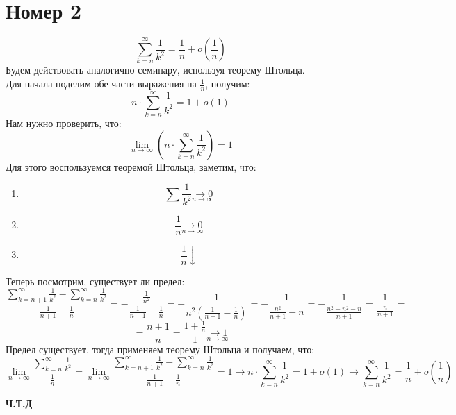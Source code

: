\documentclass[a4paper,12pt]{article}
\begin{document}
\section*{Номер 2}
\[
\sum_{k = n}^{\infty} \frac{1}{k^2} = \frac{1}{n}  + o \left(\frac1n\right)
\]
Будем действовать аналогично семинару, используя теорему Штольца.
\\
Для начала поделим обе части выражения на $\frac1n$, получим:
\[
n \cdot \sum_{k = n}^{\infty} \frac{1}{k^2} = 1 + o\left(1\right)
\]
Нам нужно проверить, что:
\[
\lim_{n \rightarrow \infty} \left(n \cdot \sum_{k = n}^{\infty} \frac{1}{k^2} \right) = 1
\]
Для этого воспользуемся теоремой Штольца, заметим, что:
\begin{enumerate}
\item
\[
\sum \frac{1}{k^2} \underset{n \rightarrow \infty}{\longrightarrow 0}
\]
\item
\[
\frac{1}{n} \underset{n \rightarrow \infty}{\longrightarrow 0}
\]
\item
\[
\frac{1}{n} \downarrow
\]
\end{enumerate}
Теперь посмотрим, существует ли предел:
\[
\frac{\sum\limits_{k = n + 1}^{\infty} \frac{1}{k^2} - \sum\limits_{k = n}^{\infty} \frac{1}{k^2}}{\frac{1}{n + 1} - \frac{1}{n}} = -\frac{\frac{1}{n^2}}{\frac{1}{n + 1} - \frac{1}{n}} = - \frac{1}{n^2\left(\frac{1}{n+1} - \frac{1}{n}\right)} = - \frac{1}{\frac{n^2}{n + 1} - n} = - \frac{1}{\frac{n^2 - n^2 - n}{n + 1}} = \frac{1}{\frac{n}{n+1}} =
\]
\[
= \frac{n+1 }{n } = \frac{1 + \frac{1}{n}}{1} \underset{n \rightarrow \infty}{\longrightarrow 1}
\]
Предел существует, тогда применяем теорему Штольца и получаем, что:
\[
\lim_{n \rightarrow \infty} \frac{\sum\limits_{k = n}^{\infty} \frac{1}{k^2}}{\frac{1}{n}} =\lim_{n \rightarrow \infty}   \frac{\sum\limits_{k = n + 1}^{\infty} \frac{1}{k^2} - \sum\limits_{k = n}^{\infty} \frac{1}{k^2}}{\frac{1}{n + 1} - \frac{1}{n}} = 1 \rightarrow n \cdot \sum_{k = n}^{\infty} \frac{1}{k^2} = 1 + o\left(1\right)  \rightarrow \sum_{k = n}^{\infty} \frac{1}{k^2} = \frac{1}{n}  + o \left(\frac1n\right)
\]
\begin{center}
\textbf{Ч.Т.Д} 
\end{center}
\end{document}

